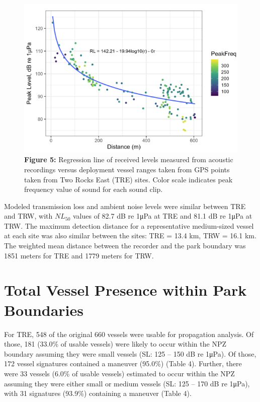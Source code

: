 \documentclass[
  letterpaper,
  oneside,
  open=any]{scrbook}
\begin{document}
\begin{figure}[H]

{\centering \includegraphics{images/Figure.5.PNG}

}

\caption{\textbf{Figure 5:} Regression line of received levels measured
from acoustic recordings versus deployment vessel ranges taken from GPS
points taken from Two Rocks East (TRE) sites. Color scale indicates peak
frequency value of sound for each sound clip.}

\end{figure}%

Modeled transmission loss and ambient noise levels were similar between
TRE and TRW, with \(NL_{50}\) values of 82.7 dB re 1μPa at TRE and 81.1
dB re 1μPa at TRW. The maximum detection distance for a representative
medium-sized vessel at each site was also similar between the sites: TRE
= 13.4 km, TRW = 16.1 km. The weighted mean distance between the
recorder and the park boundary was 1851 meters for TRE and 1779 meters
for TRW.

\section{Total Vessel Presence within Park
Boundaries}\label{total-vessel-presence-within-park-boundaries}

For TRE, 548 of the original 660 vessels were usable for propagation
analysis. Of those, 181 (33.0\% of usable vessels) were likely to occur
within the NPZ boundary assuming they were small vessels (SL: 125 -- 150
dB re 1μPa). Of those, 172 vessel signatures contained a maneuver
(95.0\%) (Table 4). Further, there were 33 vessels (6.0\% of usable
vessels) estimated to occur within the NPZ assuming they were either
small or medium vessels (SL: 125 -- 170 dB re 1μPa), with 31 signatures
(93.9\%) containing a maneuver (Table 4).
\end{document}
